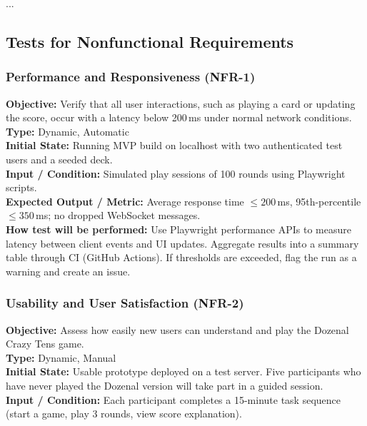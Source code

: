 \documentclass[12pt, titlepage]{article}
\begin{document}
...

\subsection{Tests for Nonfunctional Requirements}

    \subsubsection{Performance and Responsiveness (NFR-1)}
    \textbf{Objective:} Verify that all user interactions, such as playing a card or updating the score, occur with a latency below 200\,ms under normal network conditions. \\

    \textbf{Type:} Dynamic, Automatic \\

    \textbf{Initial State:} Running MVP build on localhost with two authenticated test users and a seeded deck. \\

    \textbf{Input / Condition:} Simulated play sessions of 100 rounds using Playwright scripts. \\

    \textbf{Expected Output / Metric:} Average response time $\leq 200$\,ms, 95th-percentile $\leq 350$\,ms; no dropped WebSocket messages. \\

    \textbf{How test will be performed:}
    Use Playwright performance APIs to measure latency between client events and UI updates. Aggregate results into a summary table through CI (GitHub Actions).
    If thresholds are exceeded, flag the run as a warning and create an issue.

    \subsubsection{Usability and User Satisfaction (NFR-2)}
    \textbf{Objective:} Assess how easily new users can understand and play the Dozenal Crazy Tens game. \\

    \textbf{Type:} Dynamic, Manual \\

    \textbf{Initial State:} Usable prototype deployed on a test server. Five participants who have never played the Dozenal version will take part in a guided session. \\

    \textbf{Input / Condition:} Each participant completes a 15-minute task sequence (start a game, play 3 rounds, view score explanation). \\
\end{document}
